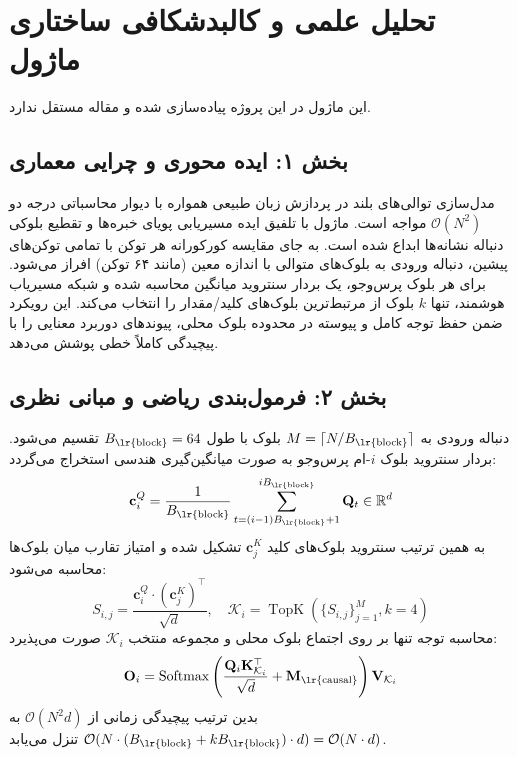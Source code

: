 \section{تحلیل علمی و کالبدشکافی ساختاری ماژول }

این ماژول در این پروژه پیاده‌سازی شده و مقاله مستقل ندارد.
\label{sec:moba}

\subsection*{بخش ۱: ایده محوری و چرایی معماری }
مدل‌سازی توالی‌های بلند در پردازش زبان طبیعی همواره با دیوار محاسباتی درجه دو $\mathcal{O}(N^2)$ مواجه است. ماژول  با تلفیق ایده مسیریابی پویای خبره‌ها  و تقطیع بلوکی دنباله نشانه‌ها ابداع شده است. به جای مقایسه کورکورانه هر توکن با تمامی توکن‌های پیشین، دنباله ورودی به بلوک‌های متوالی با اندازه معین (مانند ۶۴ توکن) افراز می‌شود. برای هر بلوک پرس‌وجو، یک بردار سنتروید میانگین محاسبه شده و شبکه مسیریاب هوشمند، تنها $k$ بلوک از مرتبط‌ترین بلوک‌های کلید/مقدار را انتخاب می‌کند. این رویکرد ضمن حفظ توجه کامل و پیوسته در محدوده بلوک محلی، پیوندهای دوربرد معنایی را با پیچیدگی کاملاً خطی پوشش می‌دهد.

\subsection*{بخش ۲: فرمول‌بندی ریاضی و مبانی نظری }
دنباله ورودی به $M = \lceil N / B_{\text{\lr{block}}} \rceil$ بلوک با طول $B_{\text{\lr{block}}} = 64$ تقسیم می‌شود. بردار سنتروید بلوک $i$-ام پرس‌وجو به صورت میانگین‌گیری هندسی استخراج می‌گردد:
\begin{equation}
\mathbf{c}_i^Q = \frac{1}{B_{\text{\lr{block}}}} \sum_{t=(i-1)B_{\text{\lr{block}}}+1}^{i B_{\text{\lr{block}}}} \mathbf{Q}_t \in \mathbb{R}^{d}
\end{equation}
به همین ترتیب سنتروید بلوک‌های کلید $\mathbf{c}_j^K$ تشکیل شده و امتیاز تقارب میان بلوک‌ها محاسبه می‌شود:
\begin{equation}
S_{i, j} = \frac{\mathbf{c}_i^Q \cdot (\mathbf{c}_j^K)^\top}{\sqrt{d}}, \quad \mathcal{K}_i = \operatorname{TopK}\left(\{S_{i, j}\}_{j=1}^M, k=4\right)
\end{equation}
محاسبه توجه تنها بر روی اجتماع بلوک محلی و مجموعه منتخب $\mathcal{K}_i$ صورت می‌پذیرد:
\begin{equation}
\mathbf{O}_i = \operatorname{Softmax}\left(\frac{\mathbf{Q}_i \mathbf{K}_{\mathcal{K}_i}^\top}{\sqrt{d}} + \mathbf{M}_{\text{\lr{causal}}}\right) \mathbf{V}_{\mathcal{K}_i}
\end{equation}
بدین ترتیب پیچیدگی زمانی از $\mathcal{O}(N^2 d)$ به $\mathcal{O}(N \cdot (B_{\text{\lr{block}}} + k B_{\text{\lr{block}}}) \cdot d) = \mathcal{O}(N \cdot d)$ تنزل می‌یابد.

